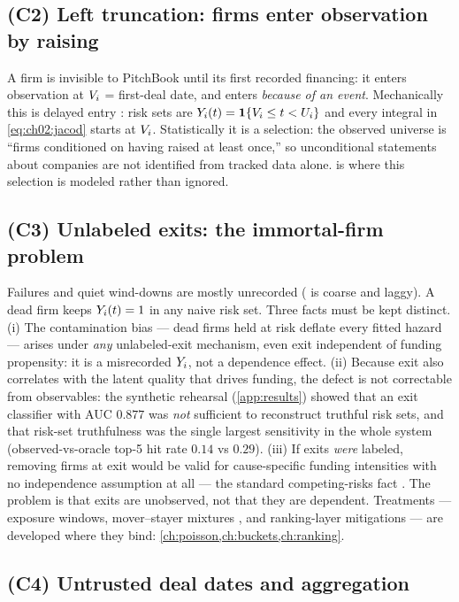 \subsection*{(C2) Left truncation: firms enter observation by raising}

A firm is invisible to PitchBook until its first recorded financing: it
enters observation at $V_i$ = first-deal date, and enters
\emph{because of an event}. Mechanically this is delayed entry
\citep{keiding1990}: risk sets are $Y_i(t) = \mathbf{1}\{V_i \le t <
U_i\}$ and every integral in \cref{eq:ch02:jacod} starts at $V_i$.
Statistically it is a selection: the observed universe is ``firms
conditioned on having raised at least once,'' so unconditional statements
about companies are not identified from tracked data alone.
 is where this selection is modeled rather than ignored.

\subsection*{(C3) Unlabeled exits: the immortal-firm problem}

Failures and quiet wind-downs are mostly unrecorded (
is coarse and laggy). A dead firm keeps $Y_i(t)=1$ in any naive risk
set. Three facts must be kept distinct. (i) The contamination bias ---
dead firms held at risk deflate every fitted hazard --- arises under
\emph{any} unlabeled-exit mechanism, even exit independent of funding
propensity: it is a misrecorded $Y_i$, not a dependence effect.
(ii) Because exit also correlates with the latent quality that drives
funding, the defect is not correctable from observables: the synthetic
rehearsal (\cref{app:results}) showed that an exit classifier with AUC
$0.877$ was \emph{not} sufficient to reconstruct truthful risk sets, and
that risk-set truthfulness was the single largest sensitivity in the whole
system (observed-vs-oracle top-5 hit rate $0.14$ vs $0.29$). (iii) If
exits \emph{were} labeled, removing firms at exit would be valid for
cause-specific funding intensities with no independence assumption at all
--- the standard competing-risks fact \citep{putter2007}. The problem is
that exits are unobserved, not that they are dependent. Treatments ---
exposure windows, mover--stayer mixtures \citep{farewell1982}, and
ranking-layer mitigations --- are developed where they bind:
\cref{ch:poisson,ch:buckets,ch:ranking}.

\subsection*{(C4) Untrusted deal dates and aggregation}


